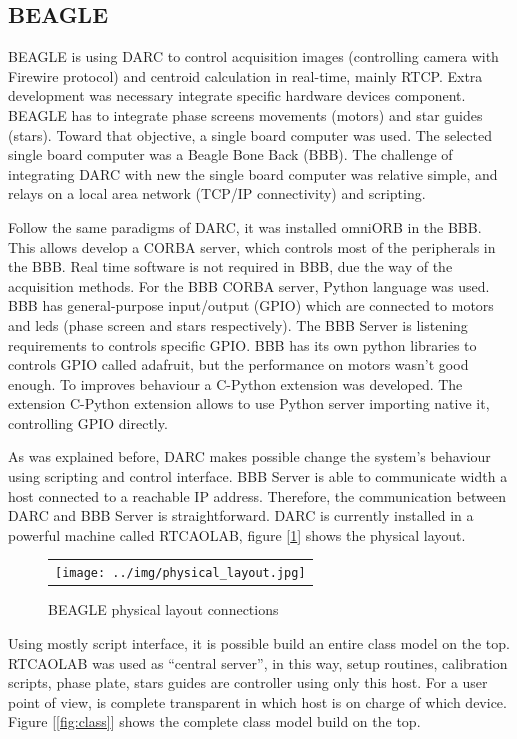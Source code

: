 \documentclass[]{spie}  %
\begin{document}
\subsection{BEAGLE}
BEAGLE is using DARC to control acquisition images (controlling camera with
        Firewire protocol) and centroid calculation in real-time, mainly RTCP.
Extra development was necessary integrate specific hardware devices component.
BEAGLE has to integrate phase screens movements (motors) and star guides
(stars). Toward that objective, a single board computer was used. The selected
single board computer was a Beagle Bone Back (BBB).  The challenge of
integrating DARC with new the single board computer was relative simple, and
relays on a local area network (TCP/IP connectivity) and scripting.  

Follow the same paradigms of DARC, it was installed omniORB in the BBB. This
allows develop a CORBA server, which controls most of the peripherals in the
BBB. Real time software is not required in BBB, due the way of the acquisition
methods.  For the BBB CORBA server, Python language was used. BBB has
general-purpose input/output (GPIO) which are connected to motors and leds
(phase screen and stars respectively). The BBB Server is listening requirements
to controls specific GPIO. BBB has its own python libraries to controls GPIO
called adafruit, but the performance on motors  wasn't good enough.   To
improves behaviour a  C-Python extension was developed. The extension C-Python
extension allows to use Python server importing native it, controlling GPIO
directly.

As was explained before, DARC makes possible change the system's behaviour
using scripting and control interface. BBB Server is able to communicate width
a host connected to a reachable IP address. Therefore, the communication
between DARC and BBB Server is straightforward. DARC is currently installed in a
powerful machine called RTCAOLAB, figure [\ref{fig:phy_lay}] shows the physical
layout. 
   \begin{figure}[!ht]
   \begin{center}
   \begin{tabular}{c}
   \texttt{[image: ../img/physical\_layout.jpg]}
   \end{tabular}
   \end{center}
   \caption[phy] 
   { \label{fig:phy_lay} BEAGLE physical layout connections}
   \end{figure} 
Using mostly script interface, it is possible build an entire class model on
the top. RTCAOLAB was used as ``central server'', in this way, setup routines,
    calibration scripts, phase plate, stars guides are controller using only
    this host. For a user point of view, is complete transparent in which host
    is on charge of which device. Figure [\ref{fig:class}] shows the complete class
    model build on the top.
\end{document}
